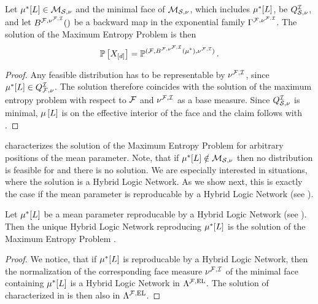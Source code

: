 \begin{theorem}
    \label{the:maxEntropyCharacterizationHLN}
    Let $\mu^*[L]\in\mathcal{M}_{\mathcal{S},\nu}$ and the minimal face of $\mathcal{M}_{\mathcal{S},\nu}$, which includes $\mu^*[L]$, be $Q^{\mathcal{I}}_{\mathcal{S},\nu}$, and let $\backwardmapwrtof{\mlnstat,\hlnfacemeasure}$ be a backward map in the exponential family $\Gamma^{\mathcal{F},\nu^{\mathcal{F},\mathcal{I}}}$.
    The solution of the Maximum Entropy Problem  is then
    \begin{align*}
        \mathbb{P}\left[X_{[d]}\right] = \mathbb{P}^{(\mathcal{F},B^{\mathcal{F},\nu^{\mathcal{F},\mathcal{I}}}(\mu^*),\nu^{\mathcal{F},\mathcal{I}})} \, .
    \end{align*}
\end{theorem}
\begin{proof}
    Any feasible distribution has to be representable by $\nu^{\mathcal{F},\mathcal{I}}$, since $\mu^*[L]\in Q^{\mathcal{I}}_{\mathcal{F},\nu}$.
    The solution therefore coincides with the solution of the maximum entropy problem with respect to $\mathcal{F}$ and $\nu^{\mathcal{F},\mathcal{I}}$ as a base measure.
    Since $Q^{\mathcal{I}}_{\mathcal{S},\nu}$ is minimal, $\mu\left[L\right]$ is on the effective interior of the face and the claim follows with .
\end{proof}

 characterizes the solution of the Maximum Entropy Problem for arbitrary positions of the mean parameter.
Note, that if $\mu^*[L]\notin\mathcal{M}_{\mathcal{S},\nu}$ then no distribution is feasible for  and there is no solution.
We are especially interested in situations, where the solution is a Hybrid Logic Network.
As we show next, this is exactly the case if the mean parameter is reproducable by a Hybrid Logic Network (see ).

\begin{theorem}
    Let $\mu^*[L]$ be a mean parameter reproducable by a Hybrid Logic Network (see ).
    Then the unique Hybrid Logic Network reproducing $\mu^*[L]$ is the solution of the Maximum Entropy Problem .
\end{theorem}
\begin{proof}
    We notice, that if $\mu^*[L]$ is reproducable by a Hybrid Logic Network, then the normalization of the corresponding face measure $\nu^{\mathcal{F},\mathcal{I}}$ of the minimal face containing $\mu^*[L]$ is a Hybrid Logic Network in $\Lambda^{\mathcal{F},\mathrm{EL}}$.
    The solution of  characterized in  is then also in $\Lambda^{\mathcal{F},\mathrm{EL}}$.
\end{proof}




